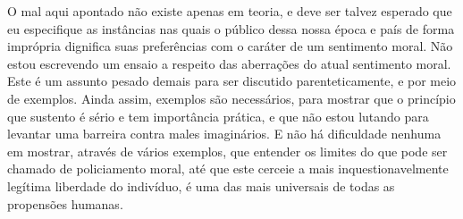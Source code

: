 O mal aqui apontado não existe apenas em teoria, e deve ser
talvez esperado que eu especifique as instâncias nas quais o público
dessa nossa época e país de forma imprópria dignifica suas preferências
com o caráter de um sentimento moral. Não estou escrevendo um ensaio a
respeito das aberrações do atual sentimento moral. Este é um assunto
pesado demais para ser discutido parenteticamente, e por meio de
exemplos. Ainda assim, exemplos são necessários, para mostrar que o
princípio que sustento é sério e tem importância prática, e que não
estou lutando para levantar uma barreira contra males imaginários. E
não há dificuldade nenhuma em mostrar, através de vários exemplos, que
entender os limites do que pode ser chamado de policiamento moral, até
que este cerceie a mais inquestionavelmente legítima liberdade do
indivíduo, é uma das mais universais de todas as propensões humanas. 

